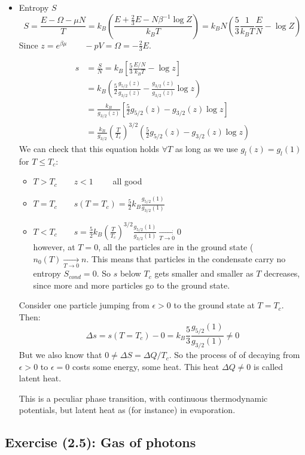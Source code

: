 \begin{itemize}
    \item Entropy $S$\\
    $$
        S = \frac{E-\Omega -\mu N}T = 
        k_B\left(\frac{E+\frac23 E-N\beta^{-1}\log Z}{k_BT}\right) =
        k_BN\left(\frac53\frac1{k_BT}\frac EN -\log Z\right)
    $$
    Since $z = e^{\beta\mu}\qquad -pV= \Omega = -\frac23 E$.

    \begin{align*}
        s &= \frac SN = k_B\left[\frac53\frac{E/N}{k_BT} - \log z\right]\\
        &= k_B\left(\frac52\frac{g_{5/2}(z)}{g_{3/2}(z)} - \frac{g_{3/2}(z)}{g_{3/2}(z)}\log z\right)\\
        &= \frac {k_B}{g_{3/2}(z)}\left[\frac52g_{5/2}(z) - g_{3/2}(z)\log z\right]\\
        &= \frac{k_B}{g_{3/2}} \left(\frac T{T_c}\right)^{3/2}\left(\frac52g_{5/2}(z) - g_{3/2}(z)\log z\right)
    \end{align*}
    We can check that this equation holds $\forall T$ as long as we use $g_l(z) = g_l(1)$ for $T \le T_c$:
    \begin{itemize}
        \item $T>T_c \qquad z<1\qquad$ all good
        \item $T=T_c \qquad s(T=T_c) = \frac52 k_B\frac{g_{5/2}(1)}{g_{3/2}(1)}$
        \item $T<T_c \qquad s = \frac52 k_B\left(\frac T{T_c}\right)^{3/2}\frac{g_{5/2}(1)}{g_{3/2}(1)} \xrightarrow[T\to 0]{}0$\\
        however, at $T=0$, all the particles are in the ground state ($n_0(T) \xrightarrow[T\to0]{}n$. This means that particles in the condensate carry no entropy $S_{cond} = 0$. So $s$ below $T_c$ gets smaller and smaller as $T$ decreases, since more and more particles go to the ground state.
    \end{itemize}
        
    Consider one particle jumping from $\epsilon > 0$ to the ground state at $T=T_c$. Then:
    $$ \Delta s = s(T=T_c) - 0 = k_B\frac 53 \frac{g_{5/2}(1)}{g_{3/2}(1)} \ne 0$$
    But we also know that $0 \ne \Delta S = \Delta Q / T_c$. So the process of of decaying from $\epsilon > 0$ to $\epsilon =0$ costs some energy, some heat. This heat $\Delta Q \ne 0$ is called latent heat.

    This is a peculiar phase transition, with continuous thermodynamic potentials, but latent heat as (for instance) in evaporation.

\end{itemize}

\subsection{Exercise (2.5): Gas of photons}